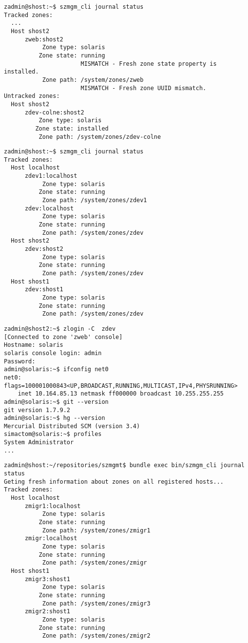\begin{lstlisting}[basicstyle=\scriptsize\ttfamily, caption={Uživatelské žurnál po změně}, float,label={code:test:journal:change}]  
zadmin@shost:~$ szmgm_cli journal status
Tracked zones:
  ...
  Host shost2
      zweb:shost2
           Zone type: solaris
          Zone state: running
                      MISMATCH - Fresh zone state property is installed.
           Zone path: /system/zones/zweb
                      MISMATCH - Fresh zone UUID mismatch.
Untracked zones:
  Host shost2
      zdev-colne:shost2
          Zone type: solaris
         Zone state: installed
          Zone path: /system/zones/zdev-colne
\end{lstlisting}
\begin{lstlisting}[basicstyle=\scriptsize\ttfamily, caption={Uživatelské žurnál po vytvoření zón}, float,label={code:test:journal}]  
zadmin@shost:~$ szmgm_cli journal status
Tracked zones:
  Host localhost
      zdev1:localhost
           Zone type: solaris
          Zone state: running
           Zone path: /system/zones/zdev1
      zdev:localhost
           Zone type: solaris
          Zone state: running
           Zone path: /system/zones/zdev
  Host shost2
      zdev:shost2
           Zone type: solaris
          Zone state: running                      
           Zone path: /system/zones/zdev
  Host shost1
      zdev:shost1
           Zone type: solaris
          Zone state: running
           Zone path: /system/zones/zdev
\end{lstlisting}
\begin{lstlisting}[basicstyle=\scriptsize\ttfamily, caption={Ověření správného vytvoření zóny}, float,label={code:test:deployment:result}]  
zadmin@shost2:~$ zlogin -C  zdev
[Connected to zone 'zweb' console]
Hostname: solaris
solaris console login: admin
Password:
admin@solaris:~$ ifconfig net0
net0: flags=100001000843<UP,BROADCAST,RUNNING,MULTICAST,IPv4,PHYSRUNNING>
    inet 10.164.85.13 netmask ff000000 broadcast 10.255.255.255
admin@solaris:~$ git --version
git version 1.7.9.2
admin@solaris:~$ hg --version
Mercurial Distributed SCM (version 3.4)
simactom@solaris:~$ profiles
System Administrator
...
\end{lstlisting}

\begin{lstlisting}[basicstyle=\scriptsize\ttfamily, caption={Uživatelský žurnál před migrací}, float,label={code:test:migration:before}]  
zadmin@shost:~/repositories/szmgmt$ bundle exec bin/szmgm_cli journal status
Geting fresh information about zones on all registered hosts...
Tracked zones:
  Host localhost
      zmigr1:localhost
           Zone type: solaris
          Zone state: running
           Zone path: /system/zones/zmigr1
      zmigr:localhost
           Zone type: solaris
          Zone state: running
           Zone path: /system/zones/zmigr                 
  Host shost1
      zmigr3:shost1
           Zone type: solaris
          Zone state: running
           Zone path: /system/zones/zmigr3
      zmigr2:shost1
           Zone type: solaris
          Zone state: running
           Zone path: /system/zones/zmigr2      
\end{lstlisting}

